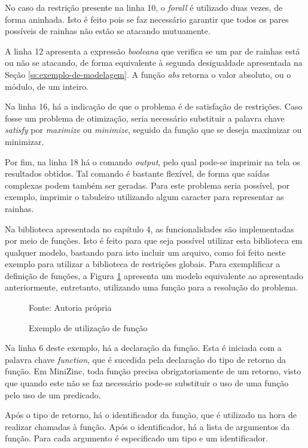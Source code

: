 No caso da restrição presente na linha 10, o \textit{forall} é utilizado duas vezes, de forma aninhada. Isto é feito pois se faz necessário garantir que todos os pares possíveis de rainhas não estão se atacando mutuamente.

A linha 12 apresenta a expressão \textit{booleana} que verifica se um par de rainhas está ou não se atacando, de forma equivalente à segunda desigualdade apresentada na Seção \ref{ss:exemplo-de-modelagem}. A função \textit{abs} retorna o valor absoluto, ou o módulo, de um inteiro.

Na linha 16, há a indicação de que o problema é de satisfação de restrições. Caso fosse um problema de otimização, seria necessário substituir a palavra chave \textit{satisfy} por \textit{maximize} ou \textit{minimize}, seguido da função que se deseja maximizar ou minimizar.

Por fim, na linha 18 há o comando \textit{output}, pelo qual pode-se imprimir na tela os resultados obtidos. Tal comando é bastante flexível, de forma que saídas complexas podem também ser geradas. Para este problema seria possível, por exemplo, imprimir o tabuleiro utilizando algum caracter para representar as rainhas.

Na biblioteca apresentada no capítulo 4, as funcionalidades são implementadas por meio de funções. Isto é feito para que seja possível utilizar esta biblioteca em qualquer modelo, bastando para isto incluir um arquivo, como foi feito neste exemplo para utilizar a biblioteca de restrições globais. Para exemplificar a definição de funções, a Figura \ref{code:nqueens} apresenta um modelo equivalente ao apresentado anteriormente, entretanto, utilizando uma função para a resolução do problema.

\begin{figure}[!ht]
  \centering
  \caption{Exemplo de utilização de função}
  \label{code:nqueens}
  
  Fonte: Autoria própria
\end{figure}

Na linha 6 deste exemplo, há a declaração da função. Esta é iniciada com a palavra chave \textit{function}, que é sucedida pela declaração do tipo de retorno da função. Em MiniZinc, toda função precisa obrigatoriamente de um retorno, visto que quando este não se faz necessário pode-se substituir o uso de uma função pelo uso de um predicado.

Após o tipo de retorno, há o identificador da função, que é utilizado na hora de realizar chamadas à função. Após o identificador, há a lista de argumentos da função. Para cada argumento é especificado um tipo e um identificador.


